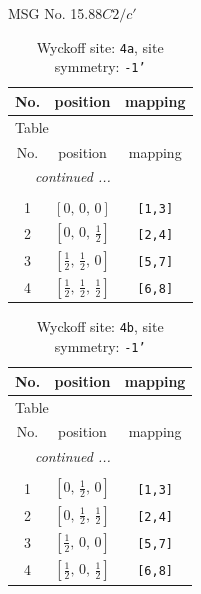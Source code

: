 \documentclass[fleqn,8pt]{jsarticle}
\begin{document}
\setcounter{MaxMatrixCols}{32}

\renewcommand{\tablename}{Table~}
\renewcommand{\figurename}{Figure~}
\begin{center}
\LARGE
MSG No. 15.88\quad$C2/c'$
\end{center}
\renewcommand{\arraystretch}{1.2}
\begin{longtable}{ccc}
\caption{Wyckoff site: {\tt 4a}, site symmetry: {\tt -1'}}
 \\
 \hline \hline
No. & position & mapping \\ \hline \endfirsthead

\multicolumn{2}{l}{\tablename\ \thetable{}} \\
 \hline \hline
No. & position & mapping \\ \hline \endhead

 \hline \hline
\multicolumn{2}{r}{\footnotesize\it continued ...} \\ \endfoot

 \hline \hline
\multicolumn{2}{r}{} \\ \endlastfoot

1 & $\left[ 0,\, 0,\, 0 \right]$ & {\tt [1,3]} \\ \hline
2 & $\left[ 0,\, 0,\, \frac{1}{2} \right]$ & {\tt [2,4]} \\ \hline
3 & $\left[ \frac{1}{2},\, \frac{1}{2},\, 0 \right]$ & {\tt [5,7]} \\ \hline
4 & $\left[ \frac{1}{2},\, \frac{1}{2},\, \frac{1}{2} \right]$ & {\tt [6,8]} \\
\end{longtable}
\renewcommand{\arraystretch}{1.2}
\begin{longtable}{ccc}
\caption{Wyckoff site: {\tt 4b}, site symmetry: {\tt -1'}}
 \\
 \hline \hline
No. & position & mapping \\ \hline \endfirsthead

\multicolumn{2}{l}{\tablename\ \thetable{}} \\
 \hline \hline
No. & position & mapping \\ \hline \endhead

 \hline \hline
\multicolumn{2}{r}{\footnotesize\it continued ...} \\ \endfoot

 \hline \hline
\multicolumn{2}{r}{} \\ \endlastfoot

1 & $\left[ 0,\, \frac{1}{2},\, 0 \right]$ & {\tt [1,3]} \\ \hline
2 & $\left[ 0,\, \frac{1}{2},\, \frac{1}{2} \right]$ & {\tt [2,4]} \\ \hline
3 & $\left[ \frac{1}{2},\, 0,\, 0 \right]$ & {\tt [5,7]} \\ \hline
4 & $\left[ \frac{1}{2},\, 0,\, \frac{1}{2} \right]$ & {\tt [6,8]} \\
\end{longtable}
\end{document}
